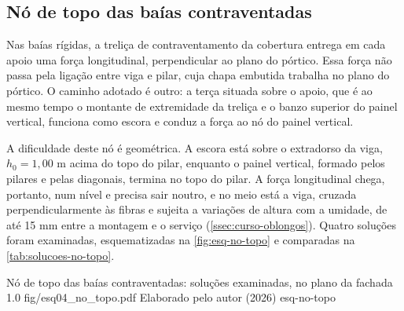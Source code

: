 \subsection{Nó de topo das baías contraventadas}\label{ssec:no-topo}

Nas baías rígidas, a treliça de contraventamento da cobertura entrega em cada
apoio uma força longitudinal, perpendicular ao plano do pórtico. Essa força não
passa pela ligação entre viga e pilar, cuja chapa embutida trabalha no plano do
pórtico. O caminho adotado é outro: a terça situada sobre o apoio, que é ao
mesmo tempo o montante de extremidade da treliça e o banzo superior do painel
vertical, funciona como escora e conduz a força ao nó do painel vertical.

A dificuldade deste nó é geométrica. A escora está sobre o extradorso da viga,
$h_0 = 1{,}00$ m acima do topo do pilar, enquanto o painel vertical, formado pelos
pilares e pelas diagonais, termina no topo do pilar. A força longitudinal chega,
portanto, num nível e precisa sair noutro, e no meio está a viga, cruzada
perpendicularmente às fibras e sujeita a variações de altura com a umidade, de
até 15 mm entre a montagem e o serviço
(\autoref{ssec:curso-oblongos}). Quatro soluções foram examinadas, esquematizadas
na \autoref{fig:esq-no-topo} e comparadas na \autoref{tab:solucoes-no-topo}.

\figura
{Nó de topo das baías contraventadas: soluções examinadas, no plano da fachada}
{1.0}
{fig/esq04_no_topo.pdf}
{Elaborado pelo autor (2026)}
{esq-no-topo}
{}
{}

